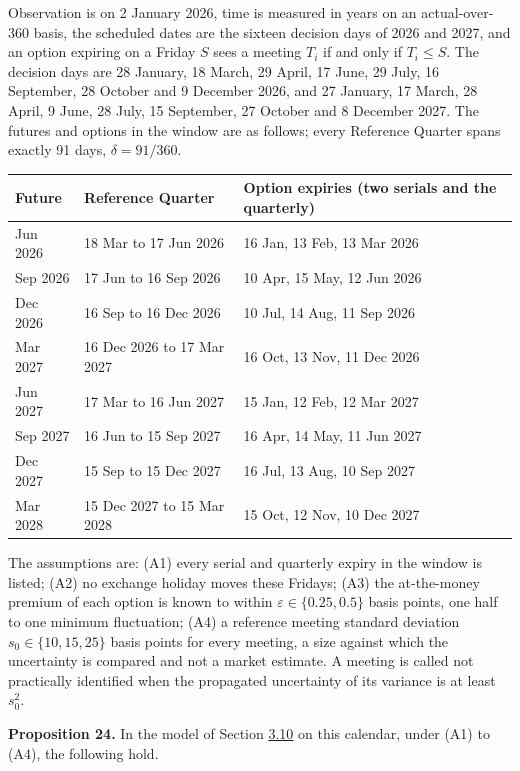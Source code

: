 \documentclass[11pt]{article}
\begin{document}
Observation is on 2 January 2026, time is measured in years on an actual-over-360 basis, the scheduled dates are the sixteen decision days of 2026 and 2027, and an option expiring on a Friday \(S\) sees a meeting \(T_i\) if and only if \(T_i \le S\). The decision days are 28 January, 18 March, 29 April, 17 June, 29 July, 16 September, 28 October and 9 December 2026, and 27 January, 17 March, 28 April, 9 June, 28 July, 15 September, 27 October and 8 December 2027. The futures and options in the window are as follows; every Reference Quarter spans exactly 91 days, \(\delta = 91/360\).

{\footnotesize
\begin{longtable}{lll}
\toprule
\textbf{Future} & \textbf{Reference Quarter} & \textbf{Option expiries (two serials and the quarterly)} \\
\midrule
\endhead
\bottomrule
\endlastfoot
Jun 2026 & 18 Mar to 17 Jun 2026 & 16 Jan, 13 Feb, 13 Mar 2026 \\
Sep 2026 & 17 Jun to 16 Sep 2026 & 10 Apr, 15 May, 12 Jun 2026 \\
Dec 2026 & 16 Sep to 16 Dec 2026 & 10 Jul, 14 Aug, 11 Sep 2026 \\
Mar 2027 & 16 Dec 2026 to 17 Mar 2027 & 16 Oct, 13 Nov, 11 Dec 2026 \\
Jun 2027 & 17 Mar to 16 Jun 2027 & 15 Jan, 12 Feb, 12 Mar 2027 \\
Sep 2027 & 16 Jun to 15 Sep 2027 & 16 Apr, 14 May, 11 Jun 2027 \\
Dec 2027 & 15 Sep to 15 Dec 2027 & 16 Jul, 13 Aug, 10 Sep 2027 \\
Mar 2028 & 15 Dec 2027 to 15 Mar 2028 & 15 Oct, 12 Nov, 10 Dec 2027 \\
\end{longtable}}

The assumptions are: (A1) every serial and quarterly expiry in the window is listed; (A2) no exchange holiday moves these Fridays; (A3) the at-the-money premium of each option is known to within \(\varepsilon \in \{0.25, 0.5\}\) basis points, one half to one minimum fluctuation; (A4) a reference meeting standard deviation \(s_0 \in \{10, 15, 25\}\) basis points for every meeting, a size against which the uncertainty is compared and not a market estimate. A meeting is called not practically identified when the propagated uncertainty of its variance is at least \(s_0^2\).

\label{res:Proposition-24}
\textbf{Proposition 24.} In the model of Section \hyperref[sec:3.10]{3.10} on this calendar, under (A1) to (A4), the following hold.
\end{document}
